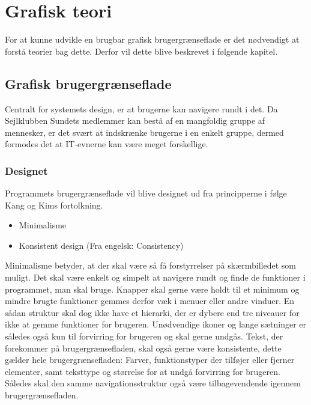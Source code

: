 \chapter{Grafisk teori}

For at kunne udvikle en brugbar grafisk brugergrænseflade er det nødvendigt at forstå teorier bag dette. 
Derfor vil dette blive beskrevet i følgende kapitel. 

\section{Grafisk brugergrænseflade} \label{chap:GUI}

Centralt for systemets design, er at brugerne kan navigere rundt i det. 
Da Sejlklubben Sundets medlemmer kan bestå af en mangfoldig gruppe af mennesker, er det svært at indskrænke brugerne i en enkelt gruppe, dermed formodes det at IT-evnerne kan være meget forskellige.


\subsection{Designet} \label{sec:Designet}

Programmets brugergrænseflade vil blive designet ud fra principperne i følge Kang og Kims fortolkning. \citep{gui1} 

\begin{itemize}
	\item Minimalisme
	\item Konsistent design (Fra engelsk: Consistency)
\end{itemize}

Minimalisme betyder, at der skal være så få forstyrrelser på skærmbilledet som muligt. 
Det skal være enkelt og simpelt at navigere rundt og finde de funktioner i programmet, man skal bruge. Knapper skal gerne være holdt til et minimum og mindre brugte funktioner gemmes derfor væk i menuer eller andre vinduer.
En sådan struktur skal dog ikke have et hierarki, der er dybere end tre niveauer for ikke at gemme funktioner for brugeren.
Unødvendige ikoner og lange sætninger er således også kun til forvirring for brugeren og skal gerne undgås.
Tekst, der forekommer på brugergrænsefladen, skal også gerne være konsistente, dette gælder hele brugergrænsefladen: Farver, funktionstyper der tilføjer eller fjerner elementer, samt teksttype og størrelse for at undgå forvirring for brugeren.
Således skal den samme navigationsstruktur også være tilbagevendende igennem brugergrænsefladen.

